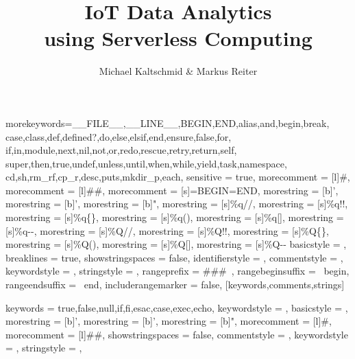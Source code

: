   {morekeywords={__FILE__,__LINE__,BEGIN,END,alias,and,begin,break,
  case,class,def,defined?,do,else,elsif,end,ensure,false,for,
  if,in,module,next,nil,not,or,redo,rescue,retry,return,self,
  super,then,true,undef,unless,until,when,while,yield,task,namespace,
  cd,sh,rm_rf,cp_r,desc,puts,mkdir_p,each},
  sensitive          = true,
  morecomment        = [l]\#,
  morecomment        = [l]\#\#,
  morecomment        = [s]{=BEGIN}{=END},
  morestring         = [b]',
  morestring         = [b]’,
  morestring         = [b]",
  morestring         = [s]{\%q/}{/},
  morestring         = [s]{\%q!}{!},
  morestring         = [s]{\%q\{}{\}},
  morestring         = [s]{\%q(}{)},
  morestring         = [s]{\%q[}{]},
  morestring         = [s]{\%q-}{-},
  morestring         = [s]{\%Q/}{/},
  morestring         = [s]{\%Q!}{!},
  morestring         = [s]{\%Q\{}{\}},
  morestring         = [s]{\%Q(}{)},
  morestring         = [s]{\%Q[}{]},
  morestring         = [s]{\%Q-}{-}
  basicstyle         = \normalfont\ttfamily,
  breaklines         = true,
  showstringspaces   = false,
  identifierstyle    = \color{auburn},
  commentstyle       = \color{gray},
  keywordstyle       = \color{ceruleanblue},
  stringstyle        = \color{green(ncs)},
  rangeprefix        = \#\#\#\ ,
  rangebeginsuffix   = \ begin,
  rangeendsuffix     = \ end,
  includerangemarker = false,
}[keywords,comments,strings]

 {
  keywords           = {true,false,null,if,fi,esac,case,exec,echo},
  keywordstyle       = \color{auburn},
  basicstyle         = \normalfont\ttfamily,
  morestring         = [b]',
  morestring         = [b]’,
  morestring         = [b]",
  morecomment        = [l]\#,
  morecomment        = [l]\#\#,
  showstringspaces   = false,
  commentstyle       = \color{red},
  keywordstyle       = \color{ceruleanblue},
  stringstyle        = \color{green(ncs)},
}

\newcommand{\whitelist}[1]{#1}

\title{IoT Data Analytics \\ using Serverless Computing}
\author{Michael Kaltschmid \& Markus Reiter}
\date{}
